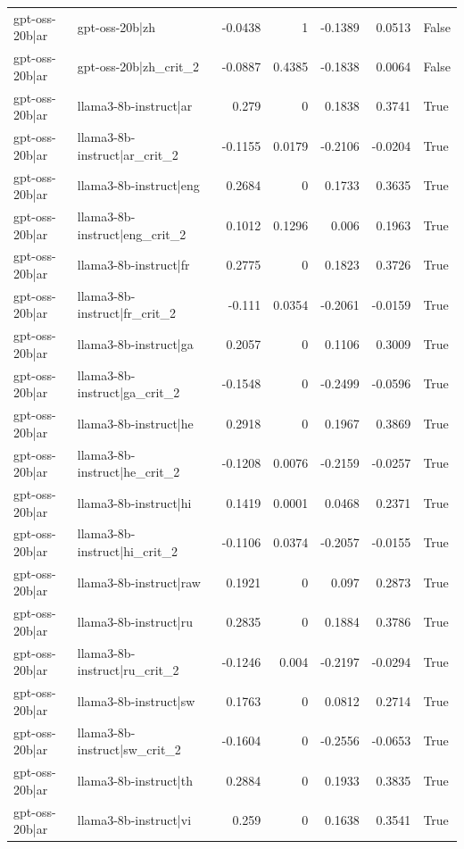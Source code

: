 \begin{table}
\begin{tabular}{l l r r r r l}
gpt-oss-20b|ar & gpt-oss-20b|zh & -0.0438 & 1 & -0.1389 & 0.0513 & False \\
gpt-oss-20b|ar & gpt-oss-20b|zh_crit_2 & -0.0887 & 0.4385 & -0.1838 & 0.0064 & False \\
gpt-oss-20b|ar & llama3-8b-instruct|ar & 0.279 & 0 & 0.1838 & 0.3741 & True \\
gpt-oss-20b|ar & llama3-8b-instruct|ar_crit_2 & -0.1155 & 0.0179 & -0.2106 & -0.0204 & True \\
gpt-oss-20b|ar & llama3-8b-instruct|eng & 0.2684 & 0 & 0.1733 & 0.3635 & True \\
gpt-oss-20b|ar & llama3-8b-instruct|eng_crit_2 & 0.1012 & 0.1296 & 0.006 & 0.1963 & True \\
gpt-oss-20b|ar & llama3-8b-instruct|fr & 0.2775 & 0 & 0.1823 & 0.3726 & True \\
gpt-oss-20b|ar & llama3-8b-instruct|fr_crit_2 & -0.111 & 0.0354 & -0.2061 & -0.0159 & True \\
gpt-oss-20b|ar & llama3-8b-instruct|ga & 0.2057 & 0 & 0.1106 & 0.3009 & True \\
gpt-oss-20b|ar & llama3-8b-instruct|ga_crit_2 & -0.1548 & 0 & -0.2499 & -0.0596 & True \\
gpt-oss-20b|ar & llama3-8b-instruct|he & 0.2918 & 0 & 0.1967 & 0.3869 & True \\
gpt-oss-20b|ar & llama3-8b-instruct|he_crit_2 & -0.1208 & 0.0076 & -0.2159 & -0.0257 & True \\
gpt-oss-20b|ar & llama3-8b-instruct|hi & 0.1419 & 0.0001 & 0.0468 & 0.2371 & True \\
gpt-oss-20b|ar & llama3-8b-instruct|hi_crit_2 & -0.1106 & 0.0374 & -0.2057 & -0.0155 & True \\
gpt-oss-20b|ar & llama3-8b-instruct|raw & 0.1921 & 0 & 0.097 & 0.2873 & True \\
gpt-oss-20b|ar & llama3-8b-instruct|ru & 0.2835 & 0 & 0.1884 & 0.3786 & True \\
gpt-oss-20b|ar & llama3-8b-instruct|ru_crit_2 & -0.1246 & 0.004 & -0.2197 & -0.0294 & True \\
gpt-oss-20b|ar & llama3-8b-instruct|sw & 0.1763 & 0 & 0.0812 & 0.2714 & True \\
gpt-oss-20b|ar & llama3-8b-instruct|sw_crit_2 & -0.1604 & 0 & -0.2556 & -0.0653 & True \\
gpt-oss-20b|ar & llama3-8b-instruct|th & 0.2884 & 0 & 0.1933 & 0.3835 & True \\
gpt-oss-20b|ar & llama3-8b-instruct|vi & 0.259 & 0 & 0.1638 & 0.3541 & True \\

\end{tabular}
\end{table}
